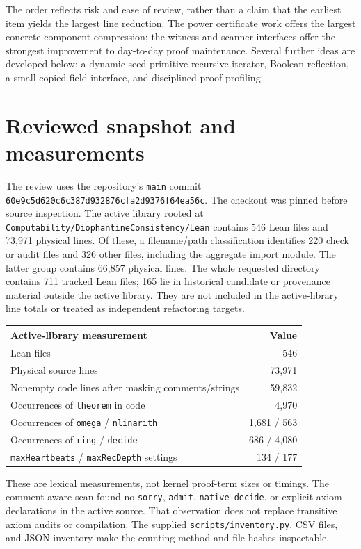 \documentclass[11pt,letterpaper]{article}
\newcommand{\code}[1]{\nolinkurl{#1}}
\newcommand{\snapshot}{\code{60e9c5d620c6c387d932876cfa2d9376f64ea56c}}
\begin{document}
The order reflects risk and ease of review, rather than a claim that the
earliest item yields the largest line reduction. The power certificate work
offers the largest concrete component compression; the witness and scanner
interfaces offer the strongest improvement to day-to-day proof maintenance.
Several further ideas are developed below: a dynamic-seed primitive-recursive
iterator, Boolean reflection, a small copied-field interface, and disciplined
proof profiling.

\section{Reviewed snapshot and measurements}

The review uses the repository's \code{main} commit \snapshot. The checkout
was pinned before source inspection. The active library rooted at
\code{Computability/DiophantineConsistency/Lean} contains 546 Lean files
and 73,971 physical lines. Of these, a filename/path classification identifies
220 check or audit files and 326 other files, including the aggregate import
module. The latter group contains 66,857 physical lines. The whole requested
directory contains 711 tracked Lean files; 165 lie in historical candidate
or provenance material outside the active library. They are not included
in the active-library line totals or treated as independent refactoring
targets.

\begin{center}
\begin{tabular}{@{}lr@{}}
\toprule
Active-library measurement & Value\\\midrule
Lean files & 546\\
Physical source lines & 73,971\\
Nonempty code lines after masking comments/strings & 59,832\\
Occurrences of \code{theorem} in code & 4,970\\
Occurrences of \code{omega} / \code{nlinarith} & 1,681 / 563\\
Occurrences of \code{ring} / \code{decide} & 686 / 4,080\\
\code{maxHeartbeats} / \code{maxRecDepth} settings & 134 / 177\\
\bottomrule
\end{tabular}
\end{center}

These are lexical measurements, not kernel proof-term sizes or timings.
The comment-aware scan found no \code{sorry}, \code{admit},
\code{native_decide}, or explicit axiom declarations in the active source.
That observation does not replace transitive axiom audits or compilation.
The supplied \code{scripts/inventory.py}, CSV files, and JSON inventory
make the counting method and file hashes inspectable.
\end{document}
